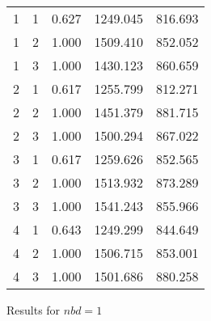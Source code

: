 \documentclass[11pt,a4paper,draft]{article}
\begin{document}
\begin{description}
\begin{figure}[!h]
\begin{tabular}{lllll}
			\hline 
			1 & 1 &  0.627 & 1249.045 & 816.693 \\
			1 & 2 &  1.000 & 1509.410 & 852.052 \\
			1 & 3 &  1.000 & 1430.123 & 860.659 \\
			\hline 
			2 & 1 &  0.617 & 1255.799 & 812.271 \\
			2 & 2 &  1.000 & 1451.379 & 881.715 \\
			2 & 3 &  1.000 & 1500.294 & 867.022 \\
			\hline 
			3 & 1 &  0.617 & 1259.626 & 852.565 \\
			3 & 2 &  1.000 & 1513.932 & 873.289 \\
			3 & 3 &  1.000 & 1541.243 & 855.966 \\
			\hline 
			4 & 1 &  0.643 & 1249.299 & 844.649 \\
			4 & 2 &  1.000 & 1506.715 & 853.001 \\
			4 & 3 &  1.000 & 1501.686 & 880.258 \\
			\hline 
			\hline 
	\end{tabular}
	\caption{Results for $nbd = 1$}
	\end{figure}


\end{description}
\end{document}
